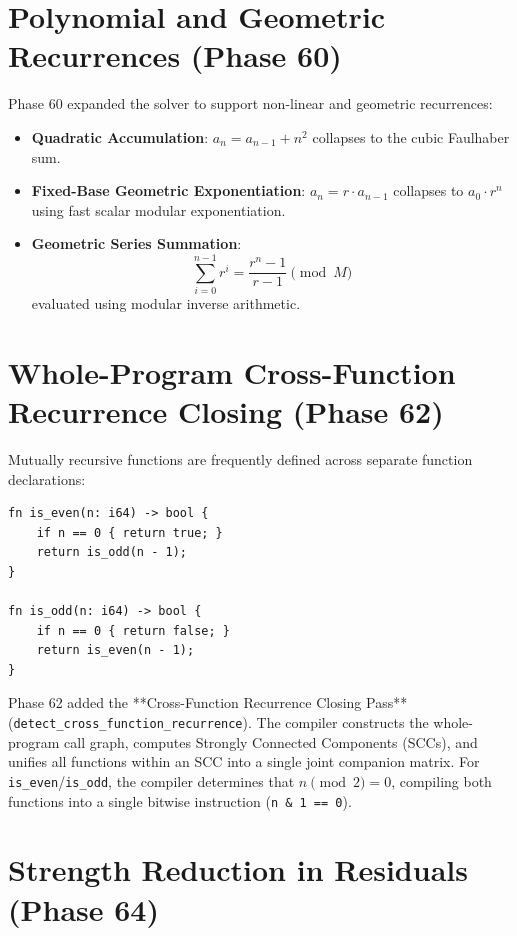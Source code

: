 \section{Polynomial and Geometric Recurrences (Phase 60)}
\label{sec:rec:phase60}

Phase 60 expanded the solver to support non-linear and geometric recurrences:
\begin{itemize}
    \item \textbf{Quadratic Accumulation}: $a_n = a_{n-1} + n^2$ collapses to the cubic Faulhaber sum.
    \item \textbf{Fixed-Base Geometric Exponentiation}: $a_n = r \cdot a_{n-1}$ collapses to $a_0 \cdot r^n$ using fast scalar modular exponentiation.
    \item \textbf{Geometric Series Summation}:
    \begin{equation}
    \sum_{i=0}^{n-1} r^i = \frac{r^n - 1}{r - 1} \pmod M
    \end{equation}
    evaluated using modular inverse arithmetic.
\end{itemize}

\section{Whole-Program Cross-Function Recurrence Closing (Phase 62)}
\label{sec:rec:cross_func}

Mutually recursive functions are frequently defined across separate function declarations:
\begin{lstlisting}[language=NumLang, caption={Cross-Function Mutual Recursion.}]
fn is_even(n: i64) -> bool {
    if n == 0 { return true; }
    return is_odd(n - 1);
}

fn is_odd(n: i64) -> bool {
    if n == 0 { return false; }
    return is_even(n - 1);
}
\end{lstlisting}

Phase 62 added the **Cross-Function Recurrence Closing Pass** (\texttt{detect\_cross\_function\_recurrence}). The compiler constructs the whole-program call graph, computes Strongly Connected Components (SCCs), and unifies all functions within an SCC into a single joint companion matrix. For \texttt{is\_even}/\texttt{is\_odd}, the compiler determines that $n \pmod 2 = 0$, compiling both functions into a single bitwise instruction (\texttt{n \& 1 == 0}).

\section{Strength Reduction in Residuals (Phase 64)}
\label{sec:rec:strength_reduce}

